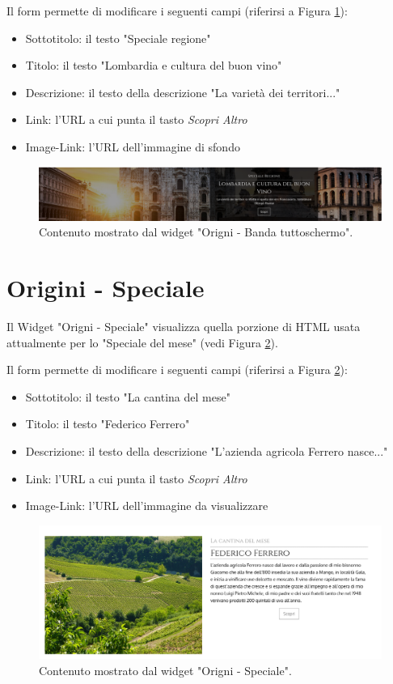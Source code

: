Il form permette di modificare i seguenti campi (riferirsi a Figura \ref{fig:oreg}):
\begin{itemize}
\item Sottotitolo: il testo "Speciale regione"
\item Titolo: il testo "Lombardia e cultura del buon vino"
\item Descrizione: il testo della descrizione "La varietà dei territori..."
\item Link: l'URL a cui punta il tasto \emph{Scopri Altro}
\item Image-Link: l'URL dell'immagine di sfondo
\end{itemize}

\begin{figure}
  \includegraphics[width=\textwidth]{figure/oreg.png}
  \caption{Contenuto mostrato dal widget "Origni - Banda tuttoschermo".}
  \label{fig:oreg}
\end{figure}

\newpage
\section{Origini - Speciale}
Il Widget "Origni - Speciale" visualizza quella porzione di HTML
usata attualmente per lo "Speciale del mese" (vedi Figura \ref{fig:ospec}).

Il form permette di modificare i seguenti campi (riferirsi a Figura \ref{fig:ospec}):
\begin{itemize}
\item Sottotitolo: il testo "La cantina del mese"
\item Titolo: il testo "Federico Ferrero"
\item Descrizione: il testo della descrizione "L’azienda agricola Ferrero nasce..."
\item Link: l'URL a cui punta il tasto \emph{Scopri Altro}
\item Image-Link: l'URL dell'immagine da visualizzare
\end{itemize}

\begin{figure}
  \includegraphics[width=\textwidth]{figure/ospec.png}
  \caption{Contenuto mostrato dal widget "Origni - Speciale".}
  \label{fig:ospec}
\end{figure}

